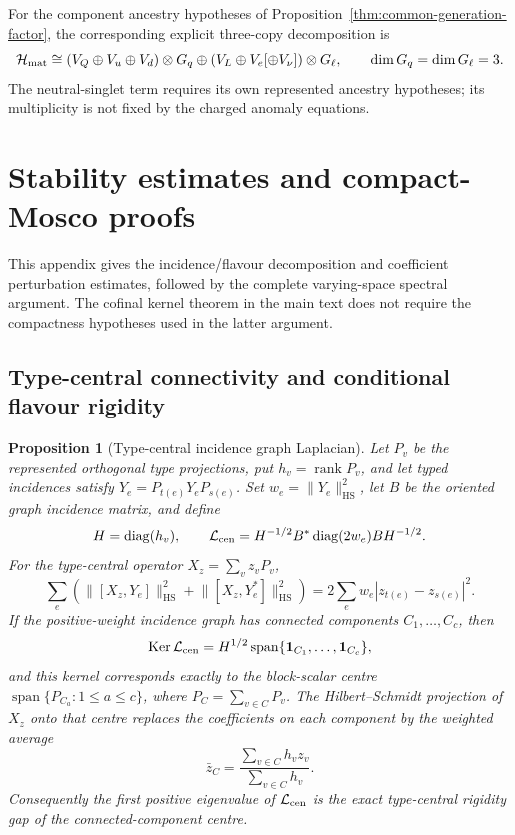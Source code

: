 \documentclass[11pt]{article}
\numberwithin{equation}{section}
\newtheorem{proposition}[theorem]{Proposition}
\theoremstyle{definition}
\theoremstyle{remark}
\newcommand{\rank}{\operatorname{rank}}
\newcommand{\Ker}{\operatorname{Ker}}
\newcommand{\Span}{\operatorname{span}}
\newcommand{\HS}{\mathrm{HS}}
\newcommand{\norm}[1]{\lVert#1\rVert}
\begin{document}
For the component ancestry hypotheses of
Proposition~\ref{thm:common-generation-factor}, the corresponding explicit
three-copy decomposition is
\[
 \mathcal H_{\rm mat}\cong
 (V_Q\oplus V_u\oplus V_d)\otimes G_q
 \oplus(V_L\oplus V_e[\oplus V_\nu])\otimes G_\ell,
 \qquad\dim G_q=\dim G_\ell=3.
\]
The neutral-singlet term requires its own represented ancestry hypotheses;
its multiplicity is not fixed by the charged anomaly equations.


\section{Stability estimates and compact-Mosco proofs}
\label{app:stability}

This appendix gives the incidence/flavour decomposition and coefficient
perturbation estimates, followed by the complete varying-space spectral
argument.  The cofinal kernel theorem in the main text does not require
the compactness hypotheses used in the latter argument.


\subsection{Type-central connectivity and conditional flavour rigidity}
\label{app:incidence-flavour-stability}

\begin{proposition}[Type-central incidence graph Laplacian]
\label{prop:type-central-graph-laplacian}
Let $P_v$ be the represented orthogonal type projections, put
$h_v=\rank P_v$, and let typed incidences satisfy
$Y_e=P_{t(e)}Y_eP_{s(e)}$.  Set
$w_e=\norm{Y_e}_{\HS}^2$, let $B$ be the oriented graph incidence matrix, and
define
\[
 H=\operatorname{diag}(h_v),
 \qquad
 \mathcal L_{\rm cen}
 =H^{-1/2}B^*\operatorname{diag}(2w_e)BH^{-1/2}.
\]
For the type-central operator $X_z=\sum_vz_vP_v$,
\begin{equation}
 \sum_e\left(
   \norm{[X_z,Y_e]}_{\HS}^2+
   \norm{[X_z,Y_e^*]}_{\HS}^2
 \right)
 =2\sum_e w_e|z_{t(e)}-z_{s(e)}|^2.
 \label{eq:type-central-graph-energy}
\end{equation}
If the positive-weight incidence graph has connected components
$C_1,\ldots,C_c$, then
\begin{equation}
 \Ker\mathcal L_{\rm cen}
 =H^{1/2}\Span\{\mathbf1_{C_1},\ldots,\mathbf1_{C_c}\},
 \label{eq:type-central-graph-kernel}
\end{equation}
and this kernel corresponds exactly to the block-scalar centre
$\Span\{P_{C_a}:1\le a\le c\}$, where
$P_C=\sum_{v\in C}P_v$.  The Hilbert--Schmidt projection of $X_z$ onto that
centre replaces the coefficients on each component by the weighted average
\[
 \bar z_C=\frac{\sum_{v\in C}h_vz_v}{\sum_{v\in C}h_v}.
\]
Consequently the first positive eigenvalue of $\mathcal L_{\rm cen}$ is the
exact type-central rigidity gap of the connected-component centre.
\end{proposition}
\end{document}

